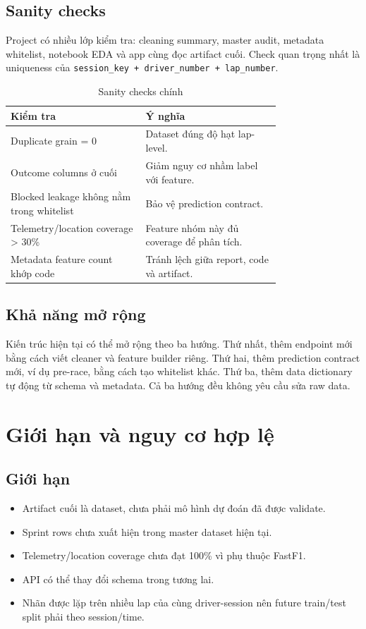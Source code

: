 \documentclass[conference]{IEEEtran}
\begin{document}
\subsection{Sanity checks}
Project có nhiều lớp kiểm tra: cleaning summary, master audit, metadata whitelist, notebook EDA và app cùng đọc artifact cuối. Check quan trọng nhất là uniqueness của \texttt{session\_key + driver\_number + lap\_number}.

\begin{table}[htbp]
\caption{Sanity checks chính}
\label{tab:sanity}
\centering
\begin{tabular}{p{0.38\linewidth}p{0.38\linewidth}}
\toprule
Kiểm tra & Ý nghĩa \\
\midrule
Duplicate grain = 0 & Dataset đúng độ hạt lap-level. \\
Outcome columns ở cuối & Giảm nguy cơ nhầm label với feature. \\
Blocked leakage không nằm trong whitelist & Bảo vệ prediction contract. \\
Telemetry/location coverage > 30\% & Feature nhóm này đủ coverage để phân tích. \\
Metadata feature count khớp code & Tránh lệch giữa report, code và artifact. \\
\bottomrule
\end{tabular}
\end{table}

\subsection{Khả năng mở rộng}
Kiến trúc hiện tại có thể mở rộng theo ba hướng. Thứ nhất, thêm endpoint mới bằng cách viết cleaner và feature builder riêng. Thứ hai, thêm prediction contract mới, ví dụ pre-race, bằng cách tạo whitelist khác. Thứ ba, thêm data dictionary tự động từ schema và metadata. Cả ba hướng đều không yêu cầu sửa raw data.

\section{Giới hạn và nguy cơ hợp lệ}
\subsection{Giới hạn}

\begin{itemize}
    \item Artifact cuối là dataset, chưa phải mô hình dự đoán đã được validate.
    \item Sprint rows chưa xuất hiện trong master dataset hiện tại.
    \item Telemetry/location coverage chưa đạt 100\% vì phụ thuộc FastF1.
    \item API có thể thay đổi schema trong tương lai.
    \item Nhãn được lặp trên nhiều lap của cùng driver-session nên future train/test split phải theo session/time.
\end{itemize}
\end{document}
